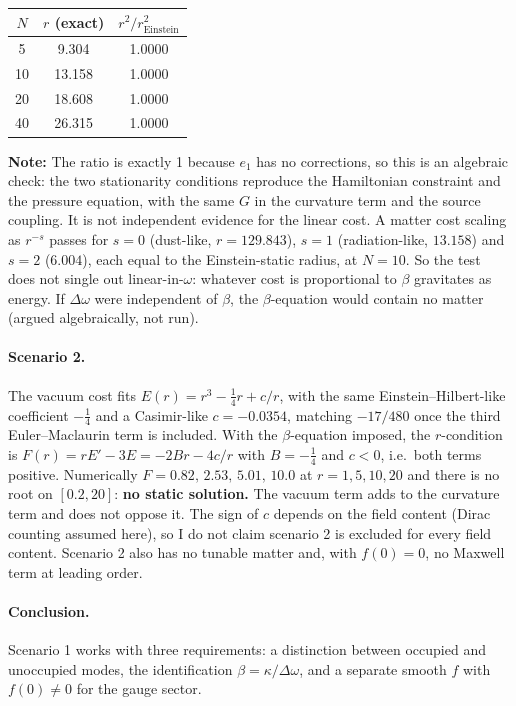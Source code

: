 \documentclass[11pt]{article}
\begin{document}
\begin{center}
\small
\begin{tabular}{@{}ccc@{}}
\toprule
$N$ & $r$ (exact) & $r^2/r^2_{\mathrm{Einstein}}$\\
\midrule
5 & 9.304 & 1.0000\\
10 & 13.158 & 1.0000\\
20 & 18.608 & 1.0000\\
40 & 26.315 & 1.0000\\
\bottomrule
\end{tabular}
\end{center}

\textbf{Note:} The ratio is exactly 1 because $e_1$ has no corrections, so this is an algebraic check: the two stationarity conditions
reproduce the Hamiltonian constraint and the pressure equation, with the same $G$ in the curvature term and the source coupling. It is not independent evidence
for the linear cost. A matter cost scaling as $r^{-s}$ passes for $s=0$ (dust-like, $r=129.843$), $s=1$ (radiation-like, $13.158$) and
$s=2$ ($6.004$), each equal to the Einstein-static radius, at $N=10$. So the test does not single out linear-in-$\omega$: whatever cost is
proportional to $\beta$ gravitates as energy. If $\Delta\omega$ were independent of $\beta$, the $\beta$-equation would contain no matter
(argued algebraically, not run).

\paragraph{Scenario 2.} The vacuum cost fits $E(r)=r^3-\tfrac14r+c/r$, with the same Einstein--Hilbert-like coefficient $-\tfrac14$ and
a Casimir-like $c=-0.0354$, matching $-17/480$ once the third Euler--Maclaurin term is included. With the $\beta$-equation imposed,
the $r$-condition is $F(r)=rE'-3E=-2Br-4c/r$ with $B=-\tfrac14$ and $c<0$, i.e.\ both terms positive. Numerically $F=0.82,\,2.53,\,5.01,\,10.0$ at $r=1,5,10,20$ and there is no root on $[0.2,20]$:
\textbf{no static solution.} The vacuum term adds to the curvature term and does not oppose it. The sign of $c$
depends on the field content (Dirac counting assumed here), so I do not claim scenario 2 is excluded for every field content. Scenario 2 also has no tunable matter and, with $f(0)=0$, no Maxwell term at leading order.

\paragraph{Conclusion.} Scenario 1 works with three requirements: a distinction between occupied and unoccupied modes, the identification
$\beta=\kappa/\Delta\omega$, and a separate smooth $f$ with $f(0)\neq0$ for the gauge sector.
\end{document}
